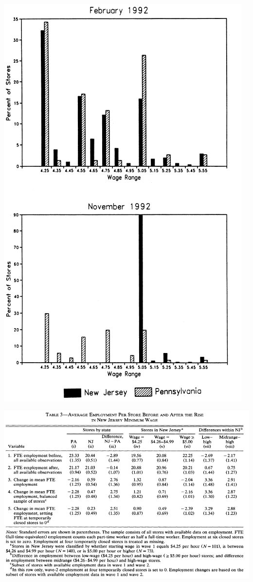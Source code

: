 \begin{frame}
  \vspace{-10pt}
  \includegraphics[height=1.1\textheight]{./resources/CKwages}
\end{frame}
  
\begin{frame}
  \includegraphics[width=\textwidth]{./resources/CKResults}
\end{frame}


